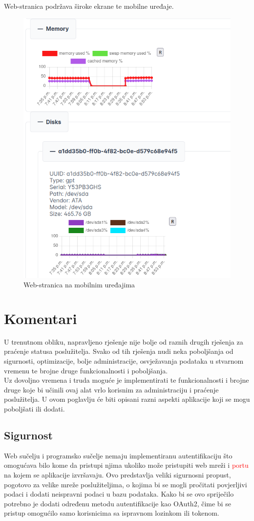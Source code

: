 \documentclass[zavrsnirad]{fer}
\begin{document}
Web-stranica podržava široke ekrane te mobilne uređaje.
\begin{figure}[htb]
	\centering
	\includegraphics[width=0.75\linewidth]{images/web_6.png} 
	\caption{Web-stranica na mobilnim uređajima}
\end{figure}
\FloatBarrier

\chapter{Komentari}
U trenutnom obliku, napravljeno rješenje nije bolje od raznih drugih rješenja za praćenje statusa poslužitelja. Svako od tih rješenja nudi neka poboljšanja od sigurnosti, optimizacije, bolje administracije, osvježavanja podataka u stvarnom vremenu te brojne druge funkcionalnosti i poboljšanja.
\\Uz dovoljno vremena i truda moguće je implementirati te funkcionalnosti i brojne druge koje bi učinili ovaj alat vrlo korisnim za administraciju i praćenje poslužitelja. U ovom poglavlju će biti opisani razni aspekti aplikacije koji se mogu poboljšati ili dodati.

\section{Sigurnost}
Web sučelju i programsko sučelje nemaju implementiranu autentifikaciju što omogućava bilo kome da pristupi njima ukoliko može pristupiti web mreži i \textcolor{red}{portu} na kojem se aplikacije izvršavaju. Ovo predstavlja veliki sigurnosni propust, pogotovo za velike mreže poslužiteljima, o kojima bi se mogli pročitati povjerljivi podaci i dodati neispravni podaci u bazu podataka. Kako bi se ovo spriječilo potrebno je dodati određenu metodu autentifikacije kao OAuth2, čime bi se pristup omogućilo samo korisnicima sa ispravnom lozinkom ili tokenom.
\end{document}
